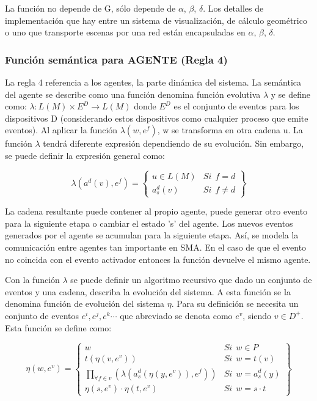 \documentclass[runningheads]{llncs}
\begin{document}
La funci\'on no depende de G, s\'olo depende de $\alpha$, $\beta$, $\delta$. Los detalles de implementaci\'on que hay entre un sistema de visualizaci\'on, de c\'alculo geom\'etrico o uno que transporte escenas por una red est\'an encapsuladas en $\alpha$, $\beta$, $\delta$.

\subsubsection{Funci\'on sem\'antica para AGENTE (Regla 4)\label{sec:FuncionAgente}}

La regla 4 referencia a los agentes, la parte din\'amica del sistema. La sem\'antica del agente se describe como una funci\'on denomina funci\'on evolutiva $\lambda$ y se define como: $\lambda: L(M) \times E^D \rightarrow L(M)$ donde $E^D$  es el conjunto de eventos para los dispositivos D (considerando estos dispositivos como cualquier proceso que emite eventos). Al aplicar la funci\'on $\lambda(w,e^{f})$, w se transforma en otra cadena u. La funci\'on $\lambda$ tendr\'a diferente expresi\'on dependiendo de su evoluci\'on. Sin embargo, se puede definir la expresi\'on general como:

\begin{equation}
    \lambda (a^{d}(v),e^{f})=
    \left\{
    \begin{array}{ll}
        u \in L(M) & \mathit{Si}  \ \ f = d \\
        a^{d}_{s}(v)  & \mathit{Si}  \ \ f \neq d
    \end{array}\right\}
\end{equation}

La cadena resultante puede contener al propio agente, puede generar otro evento para la siguiente etapa o cambiar el estado 's' del agente. Los nuevos eventos generados por el agente se acumulan para la siguiente etapa. As\'i, se modela la comunicaci\'on entre agentes tan importante en SMA. En el caso de que el evento no coincida con el evento activador entonces la funci\'on devuelve el mismo agente.

Con la funci\'on $\lambda$ se puede definir un algoritmo recursivo que dado un conjunto de eventos y una cadena, describa la evoluci\'on del sistema. A esta funci\'on se la denomina funci\'on de evoluci\'on del sistema $\eta$. Para su definici\'on se necesita un conjunto de eventos $e^i, e^j, e^k \cdots $ que abreviado se denota como $e^v$, siendo $v \in D^{+}$. Esta funci\'on se define como:

\begin{equation}
    \eta (w, e^v) = \left\{
    \begin{array}{ll}
        w   & \mathit{Si}  \ \ w \in P  \\
        t(\eta (v, e^v))    & \mathit{Si}  \ \  w = t(v)  \\
        \underset{\forall f \in v}{ \prod }(\lambda (a^{d}_{s} (\eta (y, e^v)), e^f))    & \mathit{Si}  \ \ w = a^{d}_{s}(y)\\
        \eta (s, e^v) \cdot \eta (t, e^v)   & \mathit{Si}  \ \  w = s \cdot t
    \end{array}\right\}
\end{equation}
\end{document}
